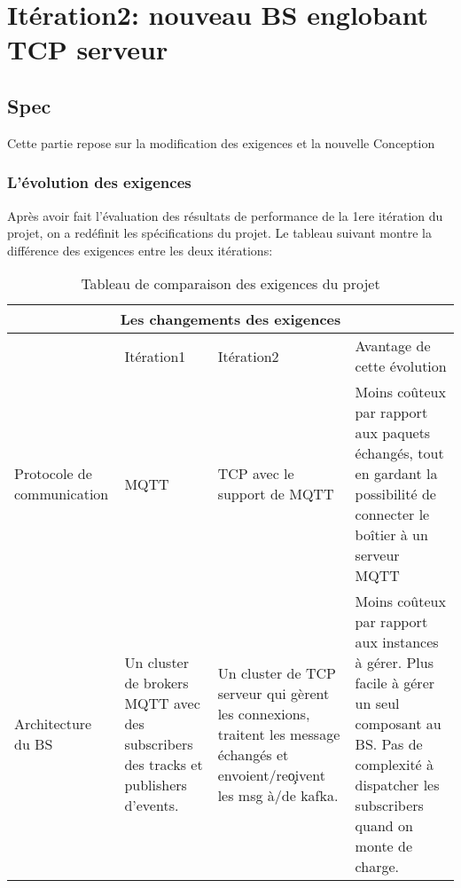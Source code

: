 \section{Itération2: nouveau BS englobant TCP serveur}
    \subsection{Spec}
    
    Cette partie repose sur la modification des exigences et la nouvelle Conception
        \subsubsection{L'évolution des exigences}
       
            Après avoir fait l’évaluation des résultats de performance 
            de la 1ere itération du projet, on a redéfinit les spécifications du projet. 
            Le tableau suivant montre la différence des exigences entre les deux itérations:
            \\
            \begin{table}[h!]
            \centering
            \begin{tabular}{|p{3cm}|p{3cm}|p{4cm}|p{5cm}|}
                \hline
                \multicolumn{4}{|c|}{Les changements des exigences } \\
                \hline   & Itération1 & Itération2 & Avantage de cette évolution\\
                \hline
                Protocole de communication & MQTT & TCP {\footnotesize avec le support de MQTT} &
                Moins coûteux par rapport aux paquets échangés, tout en gardant 
                la possibilité de connecter le boîtier à un serveur MQTT \\
                \hline
                Architecture du BS  &  Un cluster de brokers MQTT avec des 
                subscribers des tracks et publishers d’events.  & Un cluster de 
                TCP serveur qui gèrent les connexions, traitent les message échangés 
                et envoient/re\c oivent les msg à/de kafka. & Moins coûteux par 
                rapport aux instances à gérer. 
                Plus facile à gérer un seul composant au BS. 
                Pas de complexité à dispatcher les subscribers quand on monte de charge.\\
                \hline 
            \end{tabular}
            \caption{Tableau de comparaison des exigences du projet}
            \label{table:3}
        \end{table} \\
